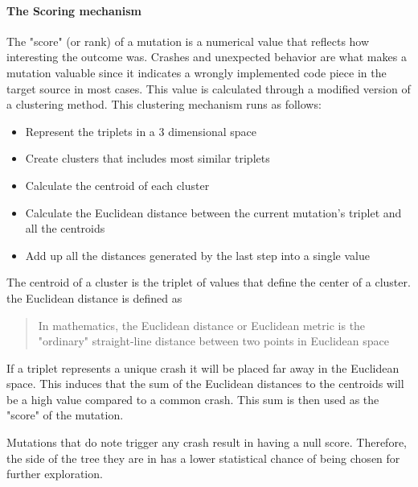 \documentclass{article}
\begin{document}
\begin{empfile}
				\paragraph{The Scoring mechanism}
The "score" (or rank) of a mutation is a numerical value that reflects how interesting the outcome was. Crashes and unexpected behavior are what makes a mutation valuable since it indicates a wrongly implemented code piece in the target source in most cases. This value is calculated through a modified version of a clustering method.
This clustering mechanism runs as follows:
	\begin{itemize}
	\item{Represent the triplets in a 3 dimensional space}
	\item{Create clusters that includes most similar triplets}
	\item{Calculate the centroid of each cluster}
	\item{Calculate the Euclidean distance between the current mutation's triplet and all the centroids}
	\item{Add up all the distances generated by the last step into a single value}
	\end{itemize}

The centroid of a cluster is the triplet of values that define the center of a cluster.
the Euclidean distance is defined as
	\begin{quotation}
	In mathematics, the Euclidean distance or Euclidean metric is the "ordinary" straight-line distance between two points in Euclidean space
	\end{quotation}
	
If a triplet represents a unique crash it will be placed far away in the Euclidean space. This induces that the sum of the Euclidean distances to the centroids will be a high value compared to a common crash. This sum is then used as the "score" of the mutation. 

Mutations that do note trigger any crash result in having a null score. Therefore, the side of the tree they are in has a lower statistical chance of being chosen for further exploration.


\end{empfile}
\end{document}
